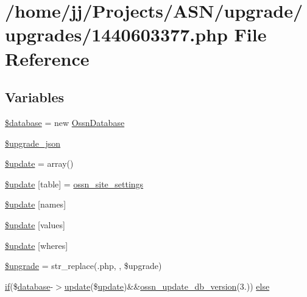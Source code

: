 \hypertarget{1440603377_8php}{}\section{/home/jj/\+Projects/\+A\+S\+N/upgrade/upgrades/1440603377.php File Reference}
\label{1440603377_8php}
\subsection*{Variables}
\begin{DoxyCompactItemize}
\item 
\hyperlink{1440603377_8php_a7691c0162d89de0b6ba47edcd8ba8878}{\$database} = new \hyperlink{class_ossn_database}{Ossn\+Database}
\item 
\hyperlink{1440603377_8php_a512525d0f5eb608ac72ca7b85e5fbf65}{\$upgrade\+\_\+json}
\item 
\hyperlink{1440603377_8php_a13a7db07df65d01cfbca768f443084cc}{\$update} = array()
\item 
\hyperlink{1440603377_8php_aee7ba5985ddf023a93862ab77e9718f9}{\$update} \mbox{[}\textquotesingle{}table\textquotesingle{}\mbox{]} = \textquotesingle{}\hyperlink{ossn_8lib_8system_8php_a610e2045b8a86c09f777b4d82e24e34c}{ossn\+\_\+site\+\_\+settings}\textquotesingle{}
\item 
\hyperlink{1440603377_8php_abcf5ad2e4fef35de04bef0168cc91ddc}{\$update} \mbox{[}\textquotesingle{}names\textquotesingle{}\mbox{]}
\item 
\hyperlink{1440603377_8php_ac82a75b4c6df37380ff77c88f041785e}{\$update} \mbox{[}\textquotesingle{}values\textquotesingle{}\mbox{]}
\item 
\hyperlink{1440603377_8php_aacde4479a904b32d0f24dea4e01f148c}{\$update} \mbox{[}\textquotesingle{}wheres\textquotesingle{}\mbox{]}
\item 
\hyperlink{1440603377_8php_a9084097ce600d3cc7a79a20ecaea9906}{\$upgrade} = str\+\_\+replace(\textquotesingle{}.php\textquotesingle{}, \textquotesingle{}\textquotesingle{}, \$upgrade)
\item 
\hyperlink{jquery_8tokeninput_8js_ad8dd46a3cbc004569e34401e9e71771a}{if}(\$\hyperlink{ossn_8config_8db_8example_8php_a4e0ca996705612048240f76ff8d4da95}{database}-\/$>$\hyperlink{_chart_8_doughnut_8js_ad58a8121caa8678969d1ff32848a77c4}{update}(\$\hyperlink{_chart_8_doughnut_8js_ad58a8121caa8678969d1ff32848a77c4}{update})\&\&\hyperlink{ossn_8lib_8upgrade_8php_aa7120e10a9c14b722b0e25c99bc86d92}{ossn\+\_\+update\+\_\+db\+\_\+version}(\textquotesingle{}3.\textquotesingle{})) \hyperlink{1440603377_8php_af00d4c833080ba7471d93ba86bcbbd13}{else}
\end{DoxyCompactItemize}


